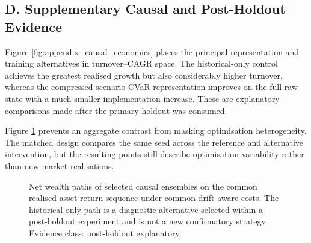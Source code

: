 \clearpage
\subsection*{D. Supplementary Causal and Post-Holdout Evidence}

Figure \ref{fig:appendix_causal_economics} places the principal representation
and training alternatives in turnover--CAGR space. The historical-only control
achieves the greatest realised growth but also considerably higher turnover,
whereas the compressed scenario-CVaR representation improves on the full raw
state with a much smaller implementation increase. These are explanatory
comparisons made after the primary holdout was consumed.

Figure \ref{fig:appendix_causal_seed_effects} prevents an aggregate contrast
from masking optimisation heterogeneity. The matched design compares the same
seed across the reference and alternative intervention, but the resulting
points still describe optimisation variability rather than new market
realisations.

\begin{figure}[!tbp]
\centering
\begin{minipage}[t]{0.56\textwidth}
\centering

\label{fig:appendix_causal_economics}
\end{minipage}\hfill
\begin{minipage}[t]{0.41\textwidth}
\centering

\label{fig:appendix_causal_seed_effects}
\end{minipage}
\end{figure}

\begin{figure}[!tbp]
\centering

\caption{Net wealth paths of selected causal ensembles on the common realised
asset-return sequence under common drift-aware costs. The historical-only path
is a diagnostic alternative selected within a post-holdout experiment and is
not a new confirmatory strategy. Evidence class: post-holdout explanatory.}
\label{fig:appendix_causal_wealth}
\end{figure}

